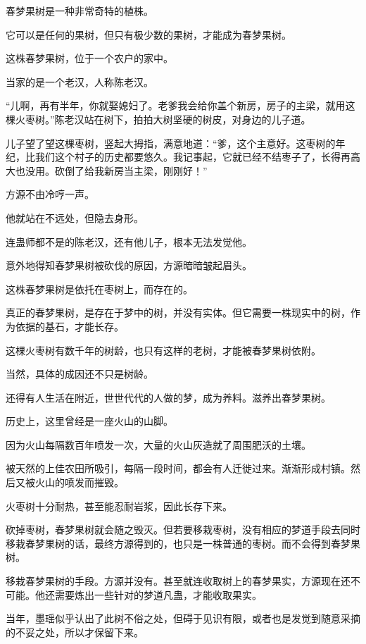 
\begin{this_body}

春梦果树是一种非常奇特的植株。

它可以是任何的果树，但只有极少数的果树，才能成为春梦果树。

这株春梦果树，位于一个农户的家中。

当家的是一个老汉，人称陈老汉。

“儿啊，再有半年，你就娶媳妇了。老爹我会给你盖个新房，房子的主梁，就用这棵火枣树。”陈老汉站在树下，拍拍大树坚硬的树皮，对身边的儿子道。

儿子望了望这棵枣树，竖起大拇指，满意地道：“爹，这个主意好。这枣树的年纪，比我们这个村子的历史都要悠久。我记事起，它就已经不结枣子了，长得再高大也没用。砍倒了给我新房当主梁，刚刚好！”

方源不由冷哼一声。

他就站在不远处，但隐去身形。

连蛊师都不是的陈老汉，还有他儿子，根本无法发觉他。

意外地得知春梦果树被砍伐的原因，方源暗暗皱起眉头。

这株春梦果树是依托在枣树上，而存在的。

真正的春梦果树，是存在于梦中的树，并没有实体。但它需要一株现实中的树，作为依据的基石，才能长存。

这棵火枣树有数千年的树龄，也只有这样的老树，才能被春梦果树依附。

当然，具体的成因还不只是树龄。

还得有人生活在附近，世世代代的人做的梦，成为养料。滋养出春梦果树。

历史上，这里曾经是一座火山的山脚。

因为火山每隔数百年喷发一次，大量的火山灰造就了周围肥沃的土壤。

被天然的上佳农田所吸引，每隔一段时间，都会有人迁徙过来。渐渐形成村镇。然后又被火山的喷发而摧毁。

火枣树十分耐热，甚至能忍耐岩浆，因此长存下来。

砍掉枣树，春梦果树就会随之毁灭。但若要移栽枣树，没有相应的梦道手段去同时移栽春梦果树的话，最终方源得到的，也只是一株普通的枣树。而不会得到春梦果树。

移栽春梦果树的手段。方源并没有。甚至就连收取树上的春梦果实，方源现在还不可能。他还需要炼出一些针对的梦道凡蛊，才能收取果实。

当年，墨瑶似乎认出了此树不俗之处，但碍于见识有限，或者也是发觉到随意采摘的不妥之处，所以才保留下来。


\end{this_body}
